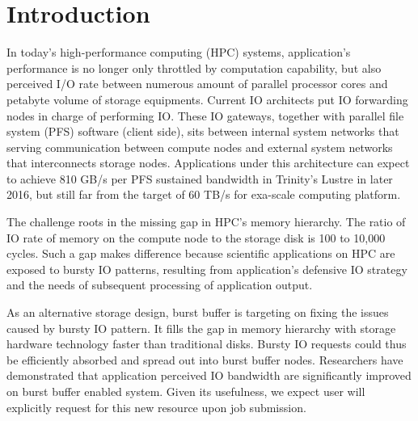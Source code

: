\section{Introduction}

In today's high-performance computing (HPC) systems,
application's performance is no longer only throttled by computation capability,
but also perceived I/O rate between
numerous amount of parallel processor cores and 
petabyte volume of storage equipments.
Current IO architects put IO forwarding nodes in charge of performing IO.
These IO gateways, together with parallel file system (PFS) software (client side),
sits between internal system networks that serving communication
between compute nodes and external system networks
that interconnects storage nodes\cite{Ross:IOSystem}.
Applications under this architecture can expect to achieve
810 GB/s per PFS sustained bandwidth in Trinity's Lustre\cite{TrinitySystem}
in later 2016, but still far from the target of 60 TB/s
for exa-scale computing platform\cite{Shalf:HPCCS:2010}.

The challenge roots in the missing gap in HPC's memory hierarchy.
The ratio of IO rate of memory on the compute node to the storage disk
is 100 to 10,000 cycles\cite{TrinitySystem}.
Such a gap makes difference because scientific applications on HPC are exposed to
bursty IO patterns\cite{Carns:MSST:2011, Kim:PDSW:2010},
resulting from application's
defensive IO strategy\cite{Latham:CSD:2012, Naik:ICPPW:2009, Dennis:CUG:2009}
and the needs of subsequent processing of application output.



As an alternative storage design, burst buffer\cite{Bent:HBP:2011, Grider:EXA:2010}
is targeting on fixing the issues caused by bursty IO pattern.
It fills the gap in memory hierarchy with storage hardware technology
faster than traditional disks.
Bursty IO requests could thus be efficiently absorbed and spread out
into burst buffer nodes.
Researchers\cite{Liu:MSST:2012} have demonstrated that application perceived IO
bandwidth are significantly improved on burst buffer enabled system.
Given its usefulness, we expect user will explicitly request for
this new resource upon job submission.


